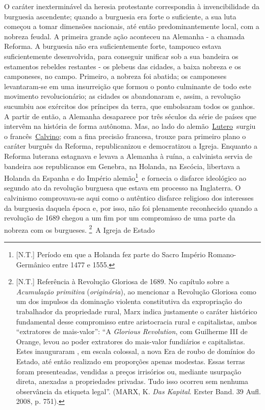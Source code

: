 O caráter inexterminável da heresia protestante correspondia à
invencibilidade da burguesia ascendente; quando a burguesia era forte o
suficiente, a sua luta começou a tomar dimensões nacionais, até então
predominantemente local, com a nobreza feudal. A primeira grande ação
aconteceu na Alemanha - a chamada Reforma. A burguesia não era
suficientemente forte, tampouco estava suficientemente desenvolvida,
para conseguir unificar sob a sua bandeira os estamentos rebeldes
restantes - os plebeus das cidades, a baixa nobreza e os camponeses, no
campo. Primeiro, a nobreza foi abatida; os camponeses levantaram-se em
uma insurreição que formou o ponto culminante de todo este movimento
revolucionário; as cidades os abandonaram e, assim, a revolução sucumbiu
aos exércitos dos príncipes da terra, que embolsaram todos os ganhos. A
partir de então, a Alemanha desaparece por três séculos da série de
países que intervêm na história de forma autônoma. Mas, ao lado do
alemão~\href{https://www.marxists.org/portugues/dicionario/verbetes/l/lutero.htm}{Lutero}~surgiu
o
francês~\href{https://www.marxists.org/portugues/dicionario/verbetes/c/calvino_joao.htm}{Calvino};
com a fina precisão francesa, trouxe para primeiro plano o caráter
burguês da Reforma, republicanizou e democratizou a Igreja. Enquanto a
Reforma luterana estagnava e levava a Alemanha à ruína, a calvinista
servia de bandeira aos republicanos em Genebra, na Holanda, na Escócia,
libertava a Holanda da Espanha e do Império alemão\footnote{{[}N.T.{]}
  Período em que a Holanda fez parte do Sacro Império Romano-Germânico
  entre 1477 e 1555.}\protect\hypertarget{n201}{}{}~e fornecia o
disfarce ideológico ao segundo ato da revolução burguesa que estava em
processo na Inglaterra. O calvinismo comprovava-se aqui como o autêntico
disfarce religioso dos interesses da burguesia daquela época e, por
isso, não foi plenamente reconhecido quando a revolução de 1689 chegou a
um fim por um compromisso de uma parte da nobreza com os burgueses.
\footnote{{[}N.T.{]} Referência à Revolução Gloriosa de 1689. No
  capítulo sobre a \emph{Acumulação primitiva} (\emph{originária}), ao
  mencionar a Revolução Gloriosa como um dos impulsos da dominação
  violenta constitutiva da expropriação do trabalhador da propriedade
  rural, Marx indica justamente o caráter histórico fundamental desse
  compromisso entre aristocracia rural e capitalistas, ambos
  ``extratores de mais-valor'': ``A \emph{Glorious Revolution}, com
  Guilherme III de Orange, levou ao poder extratores do mais-valor
  fundiários e capitalistas. Estes inauguraram , em escala colossal, a
  nova Era de roubo de domínios do Estado, até então realizado em
  proporções apenas modestas. Essas terras foram presenteadas, vendidas
  a preços irrisórios ou, mediante usurpação direta, anexadas a
  propriedades privadas. Tudo isso ocorreu sem nenhuma observância da
  etiqueta legal''. (MARX, K. \emph{Das Kapital}. Erster Band. 39 Aufl.
  2008, p. 751).}\protect\hypertarget{n202}{}{}~A Igreja de Estado
